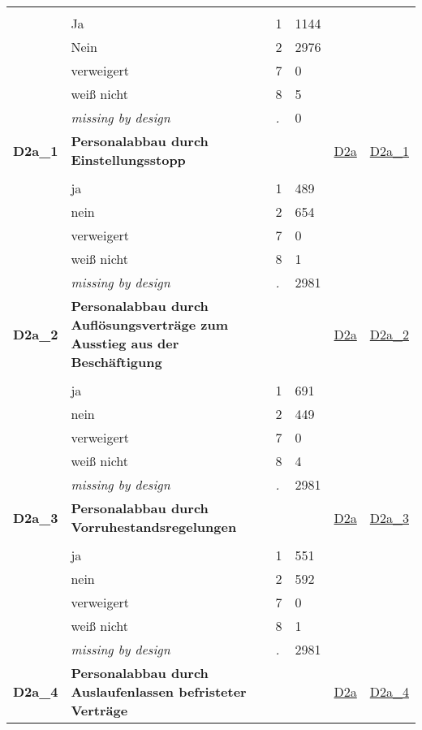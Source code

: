\begin{longtable}{| L{2.45cm} | L{6cm} | C{1.5cm} | R{1cm} | C{2.25cm} | C{2.25cm} |}
   &  &  &  &  &  \\ 
   & Ja & 1 & 1144 &  &  \\ 
   & Nein & 2 & 2976 &  &  \\ 
   & verweigert & 7 & 0 &  &  \\ 
   & weiß nicht & 8 & 5 &  &  \\ 
   & \textit{missing by design} & \textit{.} & 0 &  &  \\ 
   \midrule
\textbf{D2a\_1}\label{var:D2a:1} & \textbf{Personalabbau durch Einstellungsstopp} &  &  & \hyperref[D2a]{D2a} & \hyperref[var:suf:D2a:1]{D2a\_1} \\ 
   &  &  &  &  &  \\ 
   & ja & 1 & 489 &  &  \\ 
   & nein & 2 & 654 &  &  \\ 
   & verweigert & 7 & 0 &  &  \\ 
   & weiß nicht & 8 & 1 &  &  \\ 
   & \textit{missing by design} & \textit{.} & 2981 &  &  \\ 
   \midrule
\textbf{D2a\_2}\label{var:D2a:2} & \textbf{Personalabbau durch Auflösungsverträge zum Ausstieg aus der Beschäftigung} &  &  & \hyperref[D2a]{D2a} & \hyperref[var:suf:D2a:2]{D2a\_2} \\ 
   &  &  &  &  &  \\ 
   & ja & 1 & 691 &  &  \\ 
   & nein & 2 & 449 &  &  \\ 
   & verweigert & 7 & 0 &  &  \\ 
   & weiß nicht & 8 & 4 &  &  \\ 
   & \textit{missing by design} & \textit{.} & 2981 &  &  \\ 
   \midrule
\textbf{D2a\_3}\label{var:D2a:3} & \textbf{Personalabbau durch Vorruhestandsregelungen} &  &  & \hyperref[D2a]{D2a} & \hyperref[var:suf:D2a:3]{D2a\_3} \\ 
   &  &  &  &  &  \\ 
   & ja & 1 & 551 &  &  \\ 
   & nein & 2 & 592 &  &  \\ 
   & verweigert & 7 & 0 &  &  \\ 
   & weiß nicht & 8 & 1 &  &  \\ 
   & \textit{missing by design} & \textit{.} & 2981 &  &  \\ 
   \midrule
\textbf{D2a\_4}\label{var:D2a:4} & \textbf{Personalabbau durch Auslaufenlassen befristeter Verträge} &  &  & \hyperref[D2a]{D2a} & \hyperref[var:suf:D2a:4]{D2a\_4} \\ 

\end{longtable}

